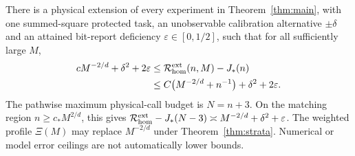 \begin{corollary}\label{cor:joint}
There is a physical extension of every experiment in Theorem~\ref{thm:main}, with one summed-square protected task, an unobservable calibration alternative $\pm\delta$ and an attained bit-report deficiency $\varepsilon\in[0,1/2]$, such that for all sufficiently large $M$,
\begin{equation}\label{eq:joint}
 \begin{split}
 cM^{-2/d}+\delta^2+2\varepsilon
 &\le\mathcal R^{\rm ext}_{\rm hom}(n,M)-J_*(n)\\
 &\le C\bigl(M^{-2/d}+n^{-1}\bigr)+\delta^2+2\varepsilon.
 \end{split}
\end{equation}
The pathwise maximum physical-call budget is $N=n+3$. On the matching region $n\ge c_*M^{2/d}$, this gives
$\mathcal R^{\rm ext}_{\rm hom}-J_*(N-3)\asymp M^{-2/d}+\delta^2+\varepsilon$.
The weighted profile $\Xi(M)$ may replace $M^{-2/d}$ under Theorem~\ref{thm:strata}. Numerical or model error ceilings are not automatically lower bounds.
\end{corollary}
